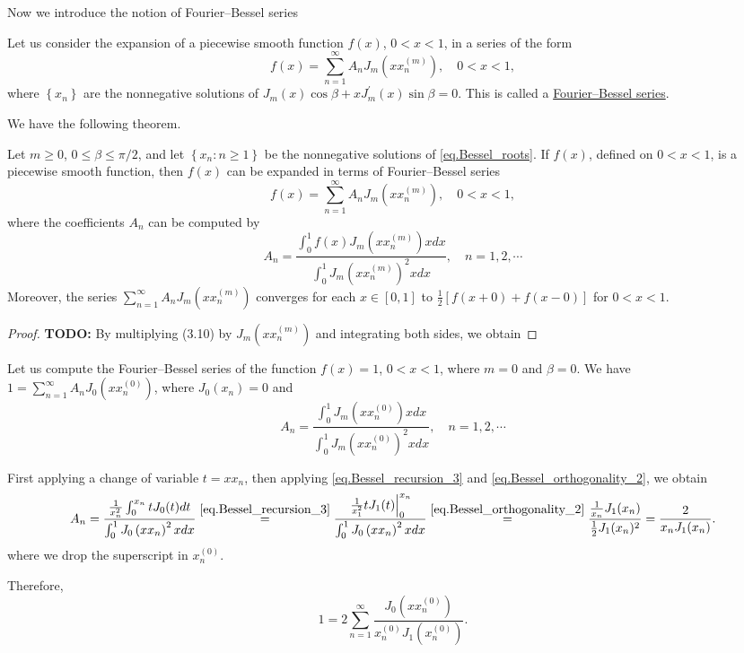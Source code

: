 Now we introduce the notion of Fourier--Bessel series

\begin{definition}
    Let us consider the expansion of a piecewise smooth function $f(x)$, $0<x<1$, in a series of the form
$$
f(x)=\sum_{n=1}^{\infty} A_n J_m\left(x x_n^{(m)}\right), \quad 0<x<1,
$$
where $\left\{x_n\right\}$ are the nonnegative solutions of $J_m(x) \cos \beta+x J_m^{\prime}(x) \sin \beta=0$. This is called a \underline{Fourier--Bessel series}. 
\end{definition}

We have the following theorem.

\begin{theorem}[]
Let $m \geq 0$, $0 \leq \beta \leq \pi / 2$, and let $\left\{x_n: n \geq 1\right\}$ be the nonnegative solutions of \eqref{eq.Bessel_roots}. If $f(x)$, defined on $0<x<1$, is a piecewise smooth function, then $f(x)$ can be expanded in terms of Fourier--Bessel series
$$
    f(x)=\sum_{n=1}^{\infty} A_n J_m\left(x x_n^{(m)}\right), \quad 0<x<1,
$$
where the coefficients $A_n$ can be computed by
$$
    A_n=\frac{\int_0^1 f(x) J_m\left(x x_n^{(m)}\right) x d x}{\int_0^1 J_m\left(x x_n^{(m)}\right)^2 x d x}, \quad n=1,2, \cdots
$$
Moreover, the series $\sum_{n=1}^{\infty} A_n J_m\left(x x_n^{(m)}\right)$ converges for each $x \in[0,1]$ to $\frac{1}{2}[f(x+0)+f(x-0)]$ for $0<x<1$.
\end{theorem}
\begin{proof}
    \textbf{TODO: } By multiplying (3.10) by $J_m\left(x x_n^{(m)}\right)$ and integrating both sides, we obtain
\end{proof}

\begin{example}[]\label{ex.Fourier_Bessel_1}
Let us compute the Fourier--Bessel series of the function $f(x)=1$, $0<x<1$, where $m=0$ and $\beta=0$. We have $1=\sum_{n=1}^{\infty} A_n J_0\left(x x_n^{(0)}\right)$, where $J_0(x_n)=0$ and
$$
A_n=\frac{\int_0^1 J_m\left(x x_n^{(0)}\right) x d x}{\int_0^1 J_m\left(x x_n^{(0)}\right)^2 x d x}, \quad n=1,2, \cdots
$$

First applying a change of variable $t = xx_n$, then applying \eqref{eq.Bessel_recursion_3} and \eqref{eq.Bessel_orthogonality_2}, we obtain
$$
A_n=\frac{\frac{1}{x_n^2} \int_0^{x_n} t J_0(t) d t}{\int_0^1 J_0\left(x x_n\right)^2 x d x}\overset{\eqref{eq.Bessel_recursion_3}}{=}\frac{\left.\frac{1}{x_1^2} t J_1(t)\right|_0 ^{x_n}}{\int_0^1 J_0\left(x x_n\right)^2 x d x}\overset{\eqref{eq.Bessel_orthogonality_2}}{=}\frac{\frac{1}{x_n} J_1(x_n)}{\frac{1}{2} J_1(x_n)^2}=\frac{2}{x_n J_1(x_n)} .
$$
where we drop the superscript in $x_n^{(0)}$.

Therefore,
$$
1=2 \sum_{n=1}^{\infty} \frac{J_0\left(x x_n^{(0)}\right)}{x_n^{(0)} J_1\left(x_n^{(0)}\right)}.
$$
\end{example}


